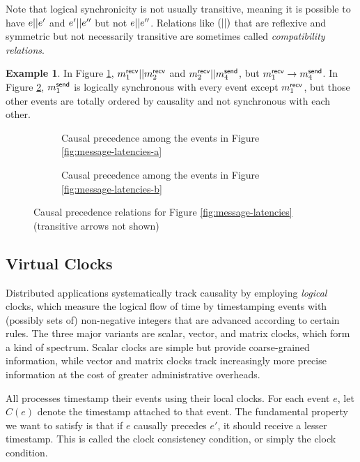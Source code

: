\documentclass[]             %
{NASA}                       %
\theoremstyle{definition}
\newtheorem{example}[theorem]{Example}
\begin{document}
Note that logical synchronicity is not usually transitive, meaning it
is possible to have $e || e'$ and $e' || e''$ but not
$e || e''$.  Relations like $\left(||\right)$ that are
reflexive and symmetric but not necessarily transitive are sometimes
called \emph{compatibility relations}.
\begin{example}
  \label{ex:synchronous-intransitive}
  In Figure \ref{fig:message-co-a}, $m_{1}^{\mathsf{recv}} || m_{2}^{\mathsf{recv}}$ and
  $m_{2}^{\mathsf{recv}} || m_{4}^{\mathsf{send}}$, but $m_{1}^{\mathsf{recv}} \to m_{4}^{\mathsf{send}}$. In
  Figure \ref{fig:message-co-b}, $m_{1}^{\mathsf{send}}$ is logically synchronous
  with every event except $m_{1}^{\mathsf{recv}}$, but those other events are
  totally ordered by causality and not synchronous with each other.
\end{example}

\begin{figure}
  \begingroup
  \setlength\belowcaptionskip{4ex}
  \begin{subfigure}{1\textwidth}
    \centering
    
    \caption{Causal precedence among the events in Figure \ref{fig:message-latencies-a}}
    \label{fig:message-co-a}
  \end{subfigure}
  \endgroup
  \begin{subfigure}{1\textwidth}
    \centering
    
    \caption{Causal precedence among the events in Figure \ref{fig:message-latencies-b}}
    \label{fig:message-co-b}
  \end{subfigure}
  \caption{Causal precedence relations for Figure \ref{fig:message-latencies} (transitive arrows not shown)}
  \label{fig:causal-precedence}
\end{figure}

\subsection{Virtual Clocks}
\label{ssec:timestamps}
Distributed applications systematically track causality by employing
\emph{logical} clocks, which measure the logical flow of time by
timestamping events with (possibly sets of) non-negative integers that
are advanced according to certain rules. The three major variants are
scalar, vector, and matrix clocks, which form a kind of
spectrum. Scalar clocks are simple but provide coarse-grained
information, while vector and matrix clocks track increasingly more
precise information at the cost of greater administrative overheads.

All processes timestamp their events using their local clocks. For
each event $e$, let $C(e)$ denote the timestamp attached to that
event. The fundamental property we want to satisfy is that if $e$
causally precedes $e'$, it should receive a lesser timestamp. This is
called the clock consistency condition, or simply the clock condition.
\end{document}
